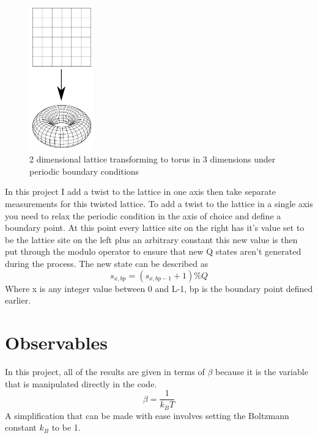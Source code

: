 \begin{figure}[H]
	\centering
	\includegraphics[width=0.25\textwidth]{2-Theory/latticetotorus.png}
	\caption{2 dimensional lattice transforming to torus in 3 dimensions under periodic boundary conditions}
\end{figure}

In this project I add a twist to the lattice in one axis then take separate measurements for this twisted lattice. To add a twist to the lattice in a single axis you need to relax the periodic condition in the axis of choice and define a boundary point. At this point every lattice site on the right has it's value set to be the lattice site on the left plus an arbitrary constant this new value is then put through the modulo operator to ensure that new Q states aren't generated during the process. The new state can be described as
\begin{equation}
s_{x,bp} = (s_{x,bp-1} + 1)\% Q
\end{equation}
Where x is any integer value between 0 and L-1, bp is the boundary point defined earlier.

\section{Observables}
	In this project, all of the results are given in terms of $\beta$ because it is the variable that is manipulated directly in the code.
	\begin{equation}
	\beta = \frac{1}{k_B T}
	\end{equation}		
	A simplification that can be made with ease involves setting the Boltzmann constant $k_B$ to be 1.
	
